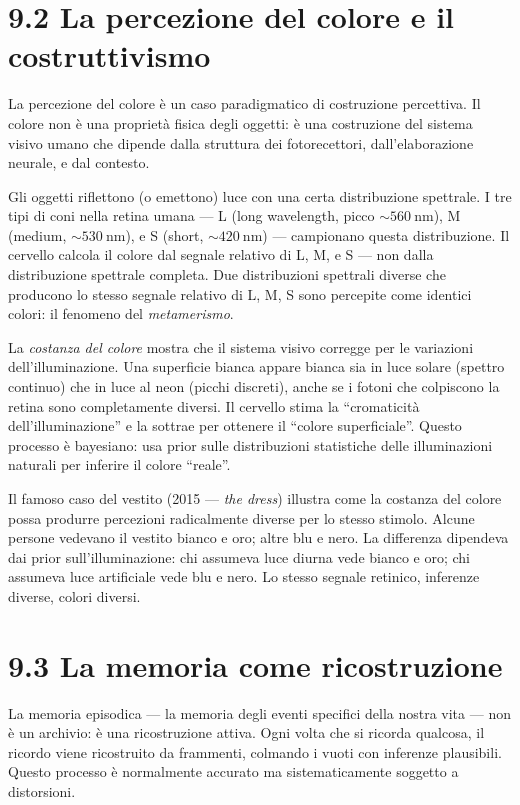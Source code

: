 \documentclass[11.5pt,a4paper,openany]{book}
\theoremstyle{remark}
\begin{document}
\section{9.2 La percezione del colore e il costruttivismo}

La percezione del colore è un caso paradigmatico di costruzione percettiva. Il colore non è una proprietà fisica degli oggetti: è una costruzione del sistema visivo umano che dipende dalla struttura dei fotorecettori, dall'elaborazione neurale, e dal contesto.

Gli oggetti riflettono (o emettono) luce con una certa distribuzione spettrale. I tre tipi di coni nella retina umana --- L (long wavelength, picco $\sim 560\ \text{nm}$), M (medium, $\sim 530\ \text{nm}$), e S (short, $\sim 420\ \text{nm}$) --- campionano questa distribuzione. Il cervello calcola il colore dal segnale relativo di L, M, e S --- non dalla distribuzione spettrale completa. Due distribuzioni spettrali diverse che producono lo stesso segnale relativo di L, M, S sono percepite come identici colori: il fenomeno del \textit{metamerismo}.

La \textit{costanza del colore} mostra che il sistema visivo corregge per le variazioni dell'illuminazione. Una superficie bianca appare bianca sia in luce solare (spettro continuo) che in luce al neon (picchi discreti), anche se i fotoni che colpiscono la retina sono completamente diversi. Il cervello stima la ``cromaticità dell'illuminazione'' e la sottrae per ottenere il ``colore superficiale''. Questo processo è bayesiano: usa prior sulle distribuzioni statistiche delle illuminazioni naturali per inferire il colore ``reale''.

Il famoso caso del vestito (2015 --- \textit{the dress}) illustra come la costanza del colore possa produrre percezioni radicalmente diverse per lo stesso stimolo. Alcune persone vedevano il vestito bianco e oro; altre blu e nero. La differenza dipendeva dai prior sull'illuminazione: chi assumeva luce diurna vede bianco e oro; chi assumeva luce artificiale vede blu e nero. Lo stesso segnale retinico, inferenze diverse, colori diversi.

\section{9.3 La memoria come ricostruzione}

La memoria episodica --- la memoria degli eventi specifici della nostra vita --- non è un archivio: è una ricostruzione attiva. Ogni volta che si ricorda qualcosa, il ricordo viene ricostruito da frammenti, colmando i vuoti con inferenze plausibili. Questo processo è normalmente accurato ma sistematicamente soggetto a distorsioni.
\end{document}
